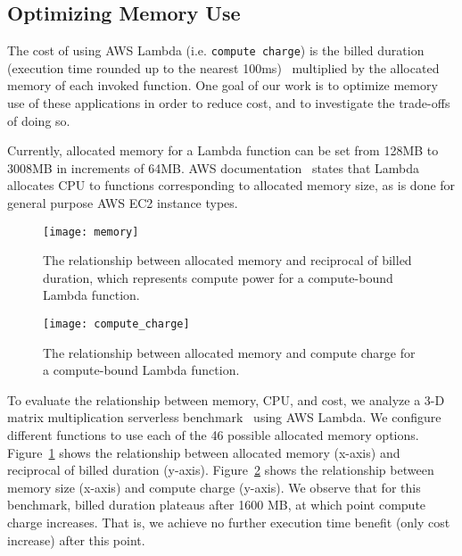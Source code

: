 \subsection{Optimizing Memory Use}

The cost of using AWS Lambda (i.e. \texttt{compute charge}) 
is the billed duration (execution time rounded up to the
nearest 100ms)~\cite{ref:pricing}
multiplied by the allocated memory of each invoked function.
One goal of our work is to optimize memory use of these
applications in order to reduce cost, and to investigate
the trade-offs of doing so.

Currently, allocated memory for a Lambda function can be set
from 128MB to 3008MB in increments of 64MB.
AWS documentation~\cite{ref:lambdalimits}
states that Lambda allocates CPU to functions  corresponding to allocated memory size,  
as is done for general purpose AWS EC2 instance types.

\begin{figure}[t] \centering 
\texttt{[image: memory]}
\caption{The relationship between allocated memory and reciprocal of billed duration, which represents compute power for a compute-bound Lambda function.
\label{fig:memory}}
\end{figure}

\begin{figure}[t] \centering 
\texttt{[image: compute\_charge]}
\caption{The relationship between allocated memory and compute charge for a compute-bound Lambda function.
\label{fig:compute_charge}}
\end{figure}


To evaluate the relationship between memory, CPU, and cost, 
we analyze a 3-D matrix multiplication serverless benchmark~\cite{ref:matrix} using AWS Lambda.
We configure different functions to use each of the 46 possible allocated memory 
options.  Figure~\ref{fig:memory} shows the relationship between allocated memory 
(x-axis) and reciprocal of billed duration (y-axis). 
Figure~\ref{fig:compute_charge} shows the relationship between memory 
size (x-axis) and compute charge (y-axis). 
We observe that for this benchmark, billed duration 
plateaus after 1600 MB, at which point compute charge increases.
That is, we achieve no further execution time benefit (only cost increase)
after this point.

